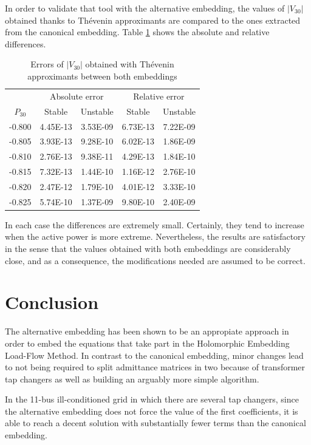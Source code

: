 \documentclass[journal]{IEEEtran}
\begin{document}
In order to validate that tool with the alternative embedding, the values of $|V_{30}|$ obtained thanks to Thévenin approximants are compared to the ones extracted from the canonical embedding. Table \ref{tab:2} shows the absolute and relative differences.
\begin{table}[!ht]
\renewcommand{\arraystretch}{1.3}
\caption{Errors of $|V_{30}|$ obtained with Thévenin approximants between both embeddings}
\label{tab:2}
\centering
\begin{tabular}{ccccc}
\hline
& \multicolumn{2}{c}{Absolute error}& \multicolumn{2}{c}{Relative error}\\
\cline{2-5}
$P_{30}$ & Stable & Unstable & Stable & Unstable\\
\hline
-0.800 & 4.45E-13 & 3.53E-09 & 6.73E-13 & 7.22E-09 \\
-0.805 & 3.93E-13 & 9.28E-10 & 6.02E-13 & 1.86E-09 \\
-0.810 & 2.76E-13 & 9.38E-11 & 4.29E-13 & 1.84E-10 \\
-0.815 & 7.32E-13 & 1.44E-10 & 1.16E-12 & 2.76E-10 \\
-0.820 & 2.47E-12 & 1.79E-10 & 4.01E-12 & 3.33E-10 \\
-0.825 & 5.74E-10 & 1.37E-09 & 9.80E-10 & 2.40E-09 \\
\hline
\end{tabular}
\end{table}
In each case the differences are extremely small. Certainly, they tend to increase when the active power is more extreme. Nevertheless, the results are satisfactory in the sense that the values obtained with both embeddings are considerably close, and as a consequence, the modifications needed are assumed to be correct.

\section{Conclusion}\label{sec5}
The alternative embedding has been shown to be an appropiate approach in order to embed the equations that take part in the Holomorphic Embedding Load-Flow Method. In contrast to the canonical embedding, minor changes lead to not being required to split admittance matrices in two because of transformer tap changers as well as building an arguably more simple algorithm. 

In the 11-bus ill-conditioned grid in which there are several tap changers, since the alternative embedding does not force the value of the first coefficients, it is able to reach a decent solution with substantially fewer terms than the canonical embedding.
\end{document}
